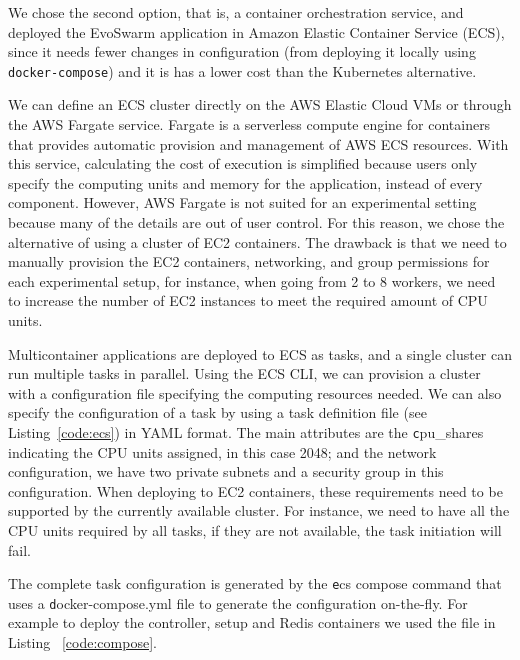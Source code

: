 \documentclass[review]{elsarticle}
\begin{document}

We chose the second option, that is, a container orchestration service, and
deployed the EvoSwarm application in Amazon Elastic Container Service (ECS),
since it needs fewer changes in configuration (from deploying it locally using
{\tt docker-compose}) and it is has a lower cost than the Kubernetes
alternative.


We can define an ECS cluster directly on the AWS Elastic Cloud VMs or through the
AWS Fargate service. Fargate is a serverless compute engine for containers that
provides automatic provision and management of AWS ECS resources. With this
service, calculating the cost of execution is simplified because users only
specify the computing units and memory for the application, instead of every
component. However, AWS Fargate is not suited for an experimental setting because
many of the details are out of user control. For this reason, we chose the
alternative of using a cluster of EC2 containers. The drawback is that we need to manually
provision the  EC2 containers, networking, and group permissions for each
experimental setup, for instance, when going from 2 to 8 workers, we need to increase the
number of EC2 instances to meet the required amount of CPU units.

Multicontainer applications are deployed to ECS as tasks, and a single cluster can run multiple tasks in
parallel. Using the ECS CLI, we can provision a cluster with a configuration file
specifying the computing resources needed. We can also specify the configuration of a task 
by using a task definition file (see Listing~\ref{code:ecs}) in YAML format.
The main attributes are the {\texttt cpu\_shares} indicating the CPU units
assigned, in this case 2048; and the network configuration, we have two private 
subnets and a security group in this configuration. When deploying to EC2 containers, these requirements
need to be supported by the currently available cluster. For instance, we need to have all 
the CPU units required by all tasks, if they are not available, the task initiation will fail.

The complete task configuration is generated by the {\texttt ecs compose command} that uses a {\texttt docker-compose.yml} file to generate 
the configuration on-the-fly. For example to deploy the controller, setup and Redis 
containers we used the file in Listing ~\ref{code:compose}.
\end{document}

